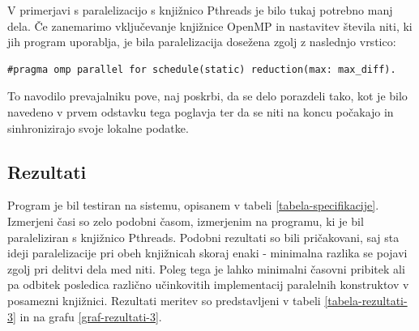 \documentclass[a4paper,titlepage,11pt]{article}
\begin{document}
V primerjavi s paralelizacijo s knjižnico Pthreads je bilo tukaj potrebno manj dela. Če zanemarimo vključevanje knjižnice OpenMP in nastavitev števila niti, ki jih program uporablja, je bila paralelizacija dosežena zgolj z naslednjo vrstico:
\begin{lstlisting}
#pragma omp parallel for schedule(static) reduction(max: max_diff).
\end{lstlisting}
To navodilo prevajalniku pove, naj poskrbi, da se delo porazdeli tako, kot je bilo navedeno v prvem odstavku tega poglavja ter da se niti na koncu počakajo in sinhronizirajo svoje lokalne podatke.

\subsection{Rezultati}

Program je bil testiran na sistemu, opisanem v tabeli \ref{tabela-specifikacije}. Izmerjeni časi so zelo podobni časom, izmerjenim na programu, ki je bil paraleliziran s knjižnico Pthreads. Podobni rezultati so bili pričakovani, saj sta ideji paralelizacije pri obeh knjižnicah skoraj enaki - minimalna razlika se pojavi zgolj pri delitvi dela med niti. Poleg tega je lahko minimalni časovni pribitek ali pa odbitek posledica različno učinkovitih implementacij paralelnih konstruktov v posamezni knjižnici. Rezultati meritev so predstavljeni v tabeli \ref{tabela-rezultati-3} in na grafu \ref{graf-rezultati-3}.
\end{document}
